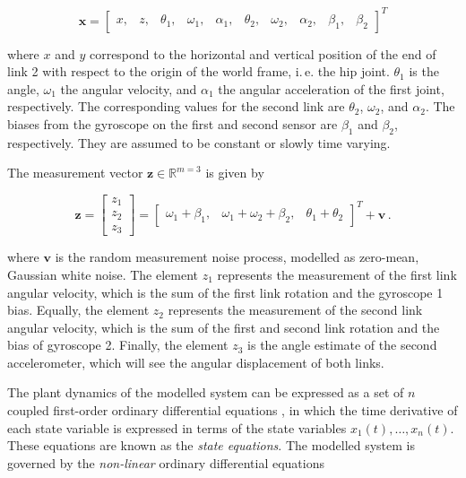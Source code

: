 \begin{equation} \label{eq:state_vector}
  \mathbf{x} = \begin{bmatrix}
  	x, & z, & \theta_1, & \omega_1, & \alpha_1, & \theta_2, & \omega_2, & \alpha_2, & \beta_1, & \beta_2
  \end{bmatrix}^T
\end{equation}

\noindent
where $x$ and $y$ correspond to the horizontal and vertical position of the end of link 2 with respect to the origin of the world frame, i.\,e. the hip joint. $\theta_1$ is the angle, $\omega_1$ the angular velocity, and $\alpha_1$ the angular acceleration of the first joint, respectively. The corresponding values for the second link are $\theta_2$, $\omega_2$, and $\alpha_2$. The biases from the gyroscope on the first and second sensor are $\beta_1$ and $\beta_2$, respectively. They are assumed to be constant or slowly time varying.

The measurement vector $\mathbf{z} \in \mathbb{R}^{m=3}$ is given by

\begin{equation} \label{eq:measurement_vector}
  \mathbf{z} = \begin{bmatrix} z_1 \\ z_2 \\ z_3 \end{bmatrix} = \begin{bmatrix}
  	\omega_1 + \beta_1, & \omega_1 + \omega_2 + \beta_2, & \theta_1 + \theta_2
  \end{bmatrix}^T + \mathbf{v}\,.
\end{equation}
 
\noindent
where $\mathbf{v}$ is the random measurement noise process, modelled as zero-mean, Gaussian white noise. The element $z_1$ represents the measurement of the first link angular velocity, which is the sum of the first link rotation and the gyroscope 1 bias. Equally, the element $z_2$ represents the measurement of the second link angular velocity, which is the sum of the first and second link rotation and the bias of gyroscope 2. Finally, the element $z_3$ is the angle estimate of the second accelerometer, which will see the angular displacement of both links.

The plant dynamics of the modelled system can be expressed as a set of $n$ coupled first-order ordinary differential equations \cite{rowell2002state}, in which the time derivative of each state variable is expressed in terms of the state variables $x_1(t), \dots, x_n(t)$. These equations are known as the \emph{state equations}. The modelled system is governed by the \emph{non-linear} ordinary differential equations

